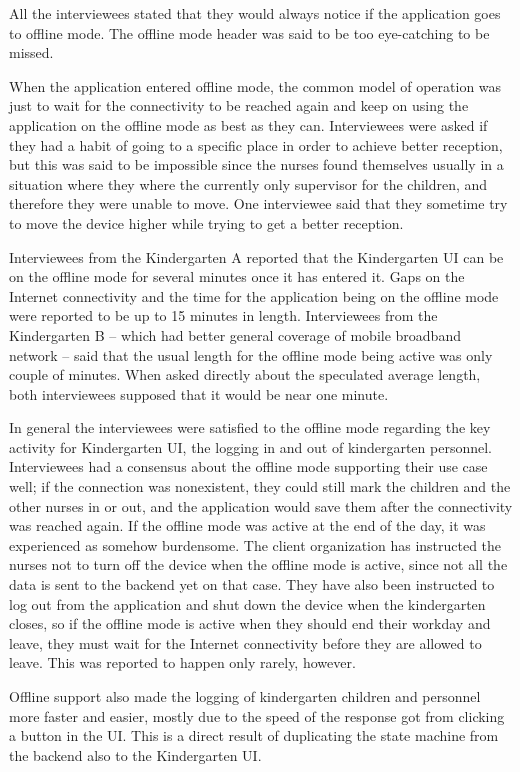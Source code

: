 All the interviewees stated that they would always notice if the application goes to offline mode. The offline mode header was said to be too eye-catching to be missed.

When the application entered offline mode, the common model of operation was just to wait for the connectivity to be reached again and keep on using the application on the offline mode as best as they can. Interviewees were asked if they had a habit of going to a specific place in order to achieve better reception, but this was said to be impossible since the nurses found themselves usually in a situation where they where the currently only supervisor for the children, and therefore they were unable to move. One interviewee said that they sometime try to move the device higher while trying to get a better reception.

Interviewees from the Kindergarten A reported that the Kindergarten UI can be on the offline mode for several minutes once it has entered it. Gaps on the Internet connectivity and the time for the application being on the offline mode were reported to be up to 15 minutes in length. Interviewees from the Kindergarten B -- which had better general coverage of mobile broadband network -- said that the usual length for the offline mode being active was only couple of minutes. When asked directly about the speculated average length, both interviewees supposed that it would be near one minute.

In general the interviewees were satisfied to the offline mode regarding the key activity for Kindergarten UI, the logging in and out of kindergarten personnel. Interviewees had a consensus about the offline mode supporting their use case well; if the connection was nonexistent, they could still mark the children and the other nurses in or out, and the application would save them after the connectivity was reached again. If the offline mode was active at the end of the day, it was experienced as somehow burdensome. The client organization has instructed the nurses not to turn off the device when the offline mode is active, since not all the data is sent to the backend yet on that case. They have also been instructed to log out from the application and shut down the device when the kindergarten closes, so if the offline mode is active when they should end their workday and leave, they must wait for the Internet connectivity before they are allowed to leave. This was reported to happen only rarely, however.

Offline support also made the logging of kindergarten children and personnel more faster and easier, mostly due to the speed of the response got from clicking a button in the UI. This is a direct result of duplicating the state machine from the backend also to the Kindergarten UI. 

